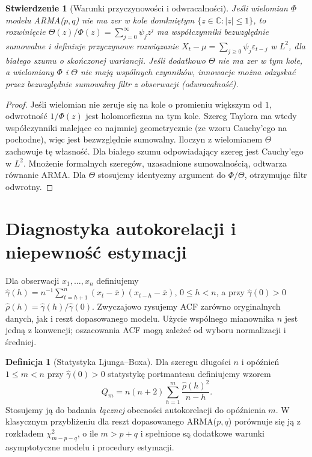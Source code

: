 \documentclass[11pt,a4paper,oneside]{report}
\numberwithin{equation}{chapter}
\theoremstyle{plain}
\newtheorem{stwierdzenie}[twierdzenie]{Stwierdzenie}
\theoremstyle{definition}
\newtheorem{definicja}{Definicja}[chapter]
\theoremstyle{remark}
\begin{document}
\begin{stwierdzenie}[Warunki przyczynowości i odwracalności]
Jeśli wielomian $\Phi$ modelu ARMA($p,q$) nie ma zer
w kole domkniętym $\{z\in\mathbb C:|z|\le1\}$,
to rozwinięcie $\Theta(z)/\Phi(z)=\sum_{j=0}^\infty\psi_jz^j$
ma współczynniki bezwzględnie sumowalne i definiuje
przyczynowe rozwiązanie
$X_t-\mu=\sum_{j\ge0}\psi_j\varepsilon_{t-j}$
w $L^2$, dla białego szumu o skończonej wariancji.
Jeśli dodatkowo $\Theta$ nie ma zer w tym kole,
a wielomiany $\Phi$ i $\Theta$ nie mają wspólnych czynników,
innowacje można odzyskać przez bezwzględnie sumowalny
filtr z obserwacji (odwracalność).
\end{stwierdzenie}
\begin{proof}
Jeśli wielomian nie zeruje się na kole o promieniu
większym od $1$, odwrotność $1/\Phi(z)$ jest
holomorficzna na tym kole. Szereg Taylora ma wtedy
współczynniki malejące co najmniej geometrycznie
(ze wzoru Cauchy'ego na pochodne), więc jest
bezwzględnie sumowalny. Iloczyn z wielomianem
$\Theta$ zachowuje tę własność. Dla białego szumu
odpowiadający szereg jest Cauchy'ego w $L^2$.
Mnożenie formalnych szeregów, uzasadnione
sumowalnością, odtwarza równanie ARMA.
Dla $\Theta$ stosujemy identyczny argument do
$\Phi/\Theta$, otrzymując filtr odwrotny.
\end{proof}

\section{Diagnostyka autokorelacji i niepewność estymacji}
Dla obserwacji $x_1,\ldots,x_n$ definiujemy
$\widehat\gamma(h)=n^{-1}\sum_{t=h+1}^n
(x_t-\overline x)(x_{t-h}-\overline x)$,
$0\le h<n$, a przy $\widehat\gamma(0)>0$
$\widehat\rho(h)=\widehat\gamma(h)/\widehat\gamma(0)$.
Zwyczajowo rysujemy ACF zarówno oryginalnych danych,
jak i reszt dopasowanego modelu. Użycie wspólnego
mianownika $n$ jest jedną z konwencji; oszacowania ACF
mogą zależeć od wyboru normalizacji i średniej.

\begin{definicja}[Statystyka Ljunga--Boxa]
Dla szeregu długości $n$ i opóźnień $1\le m<n$
przy $\widehat\gamma(0)>0$ statystykę portmanteau
definiujemy wzorem
\[
 Q_m=n(n+2)\sum_{h=1}^{m}\frac{\widehat\rho(h)^2}{n-h}.
\]
Stosujemy ją do badania \emph{łącznej} obecności
autokorelacji do opóźnienia $m$. W klasycznym
przybliżeniu dla reszt dopasowanego ARMA($p,q$)
porównuje się ją z rozkładem $\chi^2_{m-p-q}$,
o ile $m>p+q$ i spełnione są dodatkowe warunki
asymptotyczne modelu i procedury estymacji.
\end{definicja}
\end{document}
